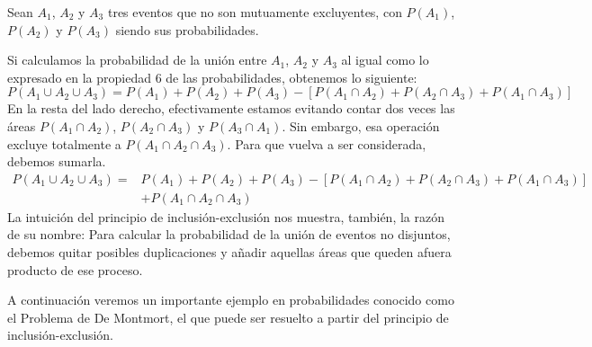 \documentclass[12pt]{article}
\begin{document}
Sean $A_{1}$, $A_{2}$ y $A_{3}$ tres eventos que no son mutuamente excluyentes, con $P(A_{1})$, $P(A_{2})$ y $P(A_{3})$ siendo sus probabilidades.

\newpage

\begin{figure}[hbt!]
\centering

\end{figure}

Si calculamos la probabilidad de la unión entre $A_{1}$, $A_{2}$ y $A_{3}$ al igual como lo expresado en la propiedad 6 de las probabilidades, obtenemos lo siguiente:
\[
  P(A_{1} \cup A_{2} \cup A_{3}) = P(A_{1}) + P(A_{2}) + P(A_{3})
                                   - \left[P(A_{1} \cap A_{2}) + P(A_{2} \cap A_{3}) + P(A_{1} \cap A_{3})\right]
\]
En la resta del lado derecho, efectivamente estamos evitando contar dos veces las áreas $P(A_{1} \cap A_{2})$, $P(A_{2} \cap A_{3})$ y $P(A_{3} \cap A_{1})$. Sin embargo, esa operación excluye totalmente a $P(A_{1} \cap A_{2} \cap A_{3})$. Para que vuelva a ser considerada, debemos sumarla.
\begin{align*}
  P(A_{1} \cup A_{2} \cup A_{3}) = &P(A_{1}) + P(A_{2}) + P(A_{3})
                                   - \left[P(A_{1} \cap A_{2}) + P(A_{2} \cap A_{3}) + P(A_{1} \cap A_{3})\right] \\
                                   &+ P(A_{1} \cap A_{2} \cap A_{3})
\end{align*}
La intuición del principio de inclusión-exclusión nos muestra, también, la razón de su nombre: Para calcular la probabilidad de la unión de eventos no disjuntos, debemos quitar posibles duplicaciones y añadir aquellas áreas que queden afuera producto de ese proceso.

A continuación veremos un importante ejemplo en probabilidades conocido como el Problema de De Montmort, el que puede ser resuelto a partir del principio de inclusión-exclusión.
\end{document}
